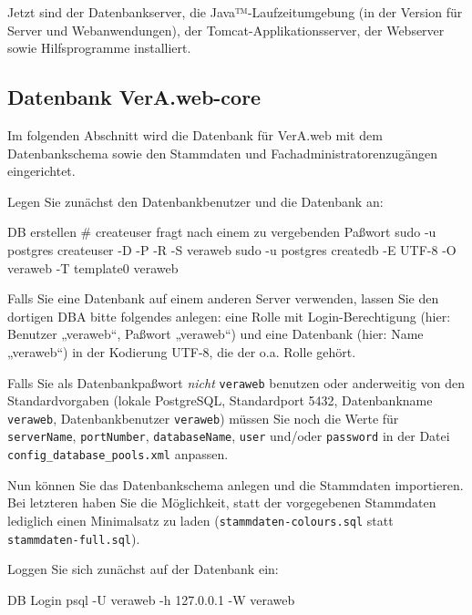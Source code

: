 Jetzt sind der Datenbankserver, die Java™-Laufzeitumgebung (in der
Version für Server und Webanwendungen), der Tomcat-Applikationsserver,
der Webserver sowie Hilfsprogramme installiert.

\subsection{Datenbank VerA.web-core}\label{subsec:setup-core-db}

Im folgenden Abschnitt wird die Datenbank für VerA.web mit dem
Datenbankschema sowie den Stammdaten und Fachadministratorenzugängen
eingerichtet.

\begin{minipage}{\textwidth}
Legen Sie zunächst den Datenbankbenutzer und die Datenbank an:

\begin{lstdump}{DB erstellen}
# createuser fragt nach einem zu vergebenden Paßwort
sudo -u postgres createuser -D -P -R -S veraweb
sudo -u postgres createdb -E UTF-8 -O veraweb -T template0 veraweb
\end{lstdump}
\end{minipage}

Falls Sie eine Datenbank auf einem anderen Server verwenden, lassen
Sie den dortigen DBA bitte folgendes anlegen: eine Rolle mit
Login-Berechtigung (hier: Benutzer „veraweb“, Paßwort „veraweb“)
und eine Datenbank (hier: Name „veraweb“) in der Kodierung UTF-8,
die der o.a. Rolle gehört.

Falls Sie als Datenbankpaßwort \emph{nicht} \texttt{veraweb} benutzen oder
anderweitig von den Standardvorgaben (lokale PostgreSQL, Standardport 5432,
Datenbankname \texttt{veraweb}, Datenbankbenutzer \texttt{veraweb}) müssen
Sie noch die Werte für \texttt{serverName}, \texttt{portNumber},
\texttt{databaseName}, \texttt{user} und/oder \texttt{password} in der
Datei \texttt{config\_database\_pools.xml} anpassen.

Nun können Sie das Datenbankschema anlegen und die Stammdaten importieren.
Bei letzteren haben Sie die Möglichkeit, statt der vorgegebenen Stammdaten
lediglich einen Minimalsatz zu laden (\texttt{stammdaten-colours.sql} statt
\texttt{stammdaten-full.sql}).

\begin{minipage}{\textwidth}
Loggen Sie sich zunächst auf der Datenbank ein:

\begin{lstdump}{DB Login}
psql -U veraweb -h 127.0.0.1 -W veraweb
\end{lstdump}
\end{minipage}

